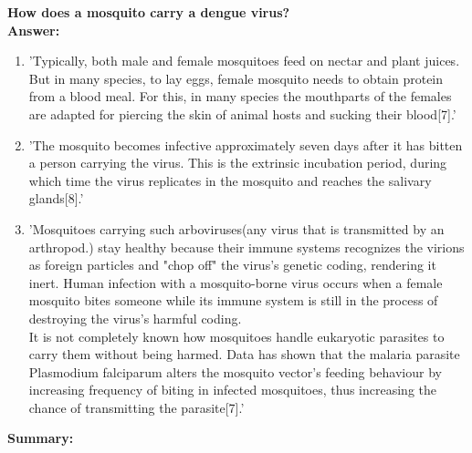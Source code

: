 \documentclass[11pt]{exam}
\begin{document}
\begin{questions}
\newpage
\question
\label{4. Mosquito: A dengue vector}
\textbf{How does a mosquito carry a dengue virus?} \\
\textbf{Answer:} \\
\begin{enumerate}
\item 'Typically, both male and female mosquitoes feed on nectar and plant juices. But in many species, to lay eggs, female mosquito needs to obtain protein from a blood meal. For this, in many species the mouthparts of the females are adapted for piercing the skin of animal hosts and sucking their blood[7].'\\
\item 'The mosquito becomes infective approximately seven days after it has bitten a person carrying the virus. This is the extrinsic incubation period, during which time the virus replicates in the mosquito and reaches the salivary glands[8].' \\

\item 'Mosquitoes carrying such arboviruses(any virus that is transmitted by an arthropod.) stay healthy because their immune systems recognizes the virions as foreign particles and "chop off" the virus's genetic coding, rendering it inert. Human infection with a mosquito-borne virus occurs when a female mosquito bites someone while its immune system is still in the process of destroying the virus's harmful coding. \\
It is not completely known how mosquitoes handle eukaryotic parasites to carry them without being harmed. Data has shown that the malaria parasite Plasmodium falciparum alters the mosquito vector's feeding behaviour by increasing frequency of biting in infected mosquitoes, thus increasing the chance of transmitting the parasite[7].'\\
\end{enumerate}
\textbf{Summary:} \\
\\ \\


\end{questions}
\end{document}
